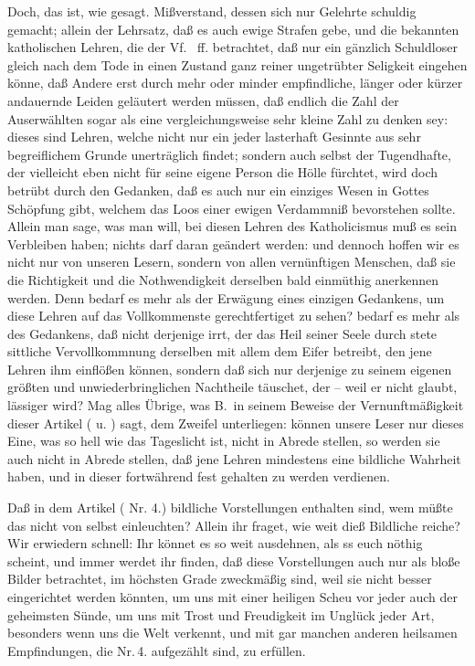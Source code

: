 Doch, das ist, wie gesagt. Mißverstand, dessen sich nur Gelehrte schuldig gemacht; allein der Lehrsatz, daß es auch ewige Strafen gebe, und die bekannten katholischen Lehren, die der Vf.\  ff. betrachtet, daß nur ein gänzlich Schuldloser gleich nach dem Tode in einen Zustand ganz reiner ungetrübter Seligkeit eingehen könne, daß Andere erst durch mehr oder minder empfindliche, länger  oder kürzer andauernde Leiden geläutert werden müssen, daß endlich die Zahl der Auserwählten sogar als eine vergleichungsweise sehr kleine Zahl zu denken sey: dieses sind Lehren, welche nicht nur ein jeder lasterhaft Gesinnte aus sehr begreiflichem Grunde unerträglich findet; sondern auch selbst der Tugendhafte, der vielleicht eben nicht für seine eigene Person die Hölle fürchtet, wird doch betrübt durch den Gedanken, daß es auch nur ein einziges Wesen in Gottes Schöpfung gibt, welchem das Loos einer ewigen Verdammniß bevorstehen sollte. Allein man sage, was man will, bei diesen Lehren des Katholicismus muß es sein Verbleiben haben; nichts darf daran geändert werden: und dennoch hoffen wir es nicht nur von unseren Lesern, sondern von allen vernünftigen Menschen, daß sie die Richtigkeit und die Nothwendigkeit derselben bald einmüthig anerkennen werden. Denn bedarf es mehr als der Erwägung eines einzigen Gedankens, um diese Lehren auf das Vollkommenste gerechtfertiget zu sehen? bedarf es mehr als des Gedankens, daß nicht derjenige irrt, der das Heil seiner Seele durch stete sittliche Vervollkommnung derselben mit allem dem Eifer betreibt, den jene Lehren ihm einflößen können, sondern daß sich nur derjenige zu seinem eigenen größten und unwiederbringlichen Nachtheile täuschet, der -- weil er nicht glaubt, lässiger wird? Mag alles Übrige, was B.\ in seinem Beweise der Vernunftmäßigkeit dieser Artikel ( u. ) sagt, dem Zweifel unterliegen: können unsere Leser nur dieses Eine, was so hell wie das Tageslicht ist, nicht in Abrede stellen, so werden sie auch nicht in Abrede stellen, daß jene Lehren mindestens eine bildliche Wahrheit haben, und in dieser fortwährend fest gehalten zu werden verdienen. \par
Daß in dem Artikel  ( Nr. 4.) bildliche Vorstellungen enthalten sind, wem müßte das nicht von selbst einleuchten? Allein ihr fraget, wie weit dieß Bildliche reiche? Wir erwiedern schnell: Ihr könnet es so weit ausdehnen, als ss euch nöthig scheint, und immer werdet ihr finden, daß diese Vorstellungen auch nur als bloße Bilder betrachtet, im höchsten Grade zweckmäßig  sind, weil sie nicht besser eingerichtet werden könnten, um uns mit einer heiligen Scheu vor jeder auch der geheimsten Sünde, um uns mit Trost und Freudigkeit im Unglück jeder Art, besonders wenn uns die Welt verkennt, und mit gar manchen anderen heilsamen Empfindungen, die  Nr.\,4. aufgezählt sind, zu erfüllen. \par

